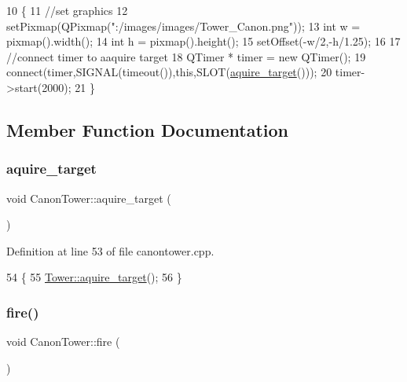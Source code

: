\begin{DoxyCode}
10 \{
11     \textcolor{comment}{//set graphics}
12     setPixmap(QPixmap(\textcolor{stringliteral}{":/images/images/Tower\_Canon.png"}));
13     \textcolor{keywordtype}{int} w = pixmap().width();
14     \textcolor{keywordtype}{int} h = pixmap().height();
15     setOffset(-w/2,-h/1.25);
16 
17     \textcolor{comment}{//connect timer to aaquire target}
18     QTimer * timer = \textcolor{keyword}{new} QTimer();
19     connect(timer,SIGNAL(timeout()),\textcolor{keyword}{this},SLOT(\hyperlink{class_canon_tower_a02bacc0ba6efc6252b15c0daffbf87a9}{aquire\_target}()));
20     timer->start(2000);
21 \}
\end{DoxyCode}


\subsection{Member Function Documentation}
\mbox{\label{class_canon_tower_a02bacc0ba6efc6252b15c0daffbf87a9}} 
\subsubsection{\texorpdfstring{aquire\+\_\+target}{aquire\_target}}
{\footnotesize\ttfamily void Canon\+Tower\+::aquire\+\_\+target (\begin{DoxyParamCaption}{ }\end{DoxyParamCaption})\hspace{0.3cm}{\ttfamily [slot]}}



Definition at line 53 of file canontower.\+cpp.


\begin{DoxyCode}
54 \{
55     \hyperlink{class_tower_a6e0df1e43e746622967918aaf6f42dce}{Tower::aquire\_target}();
56 \}
\end{DoxyCode}
\mbox{\label{class_canon_tower_aa8d13cf8b8d530256b95746620e16234}} 
\subsubsection{\texorpdfstring{fire()}{fire()}}
{\footnotesize\ttfamily void Canon\+Tower\+::fire (\begin{DoxyParamCaption}{ }\end{DoxyParamCaption})\hspace{0.3cm}{\ttfamily [virtual]}}



